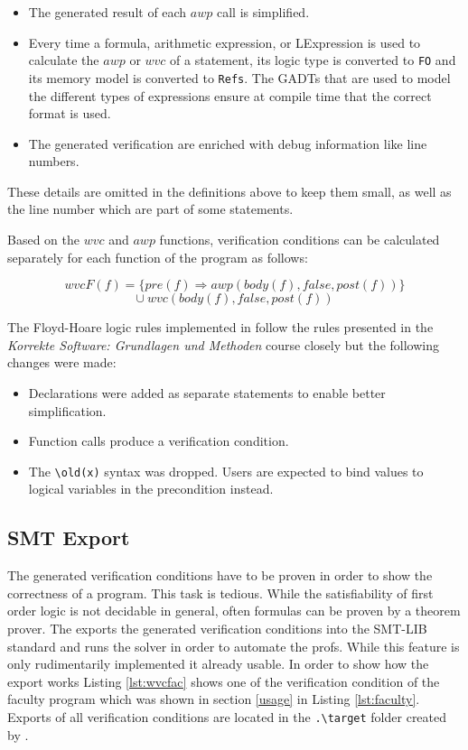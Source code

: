 \documentclass[12pt]{article}
\begin{document}
\begin{itemize}
    \item The generated result of each $awp$ call is simplified.
    \item Every time a formula, arithmetic expression, or LExpression is used to calculate the $awp$ or $wvc$ of a statement, its logic type is converted to \texttt{FO} and its memory model is converted to \texttt{Refs}.
    The GADTs that are used to model the different types of expressions ensure at compile time that the correct format is used.
    \item The generated verification are enriched with debug information like line numbers.
\end{itemize}

These details are omitted in the definitions above to keep them small, as well as the line number which are part of some statements.

Based on the $wvc$ and $awp$ functions, verification conditions can be calculated separately for each function of the program as follows:

\[wvcF(f) = \{pre(f)\Rightarrow awp(body(f), false, post(f))\} \]
\[\cup\ wvc(body(f), false, post(f))\]

The Floyd-Hoare logic rules implemented in \verifyc follow the rules presented in the 
\emph{Korrekte Software: Grundlagen und Methoden} course closely but the following changes were made:

\begin{itemize}
    \item Declarations were added as separate statements to enable better simplification.
    \item Function calls produce a verification condition.
    \item The \texttt{\textbackslash old(x)} syntax was dropped. Users are expected to bind values to logical variables in the precondition instead.
\end{itemize}

\subsection{SMT Export}
The generated verification conditions have to be proven in order to show the correctness of a program.
This task is tedious.
While the satisfiability of first order logic is not decidable in general, often formulas can be proven by a theorem prover.
The \verifyc exports the generated verification conditions into the SMT-LIB standard and runs the \zthree solver in order to automate the profs.
While this feature is only rudimentarily implemented it already usable.
In order to show how the export works Listing \ref{lst:wvcfac} shows one of the verification condition of the faculty program which was shown in section \ref{usage} in Listing \ref{lst:faculty}.
Exports of all verification conditions are located in the \texttt{.\textbackslash target} folder created by \verifyc.
\end{document}
